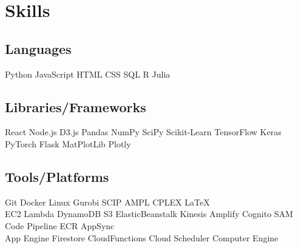 \documentclass[]{plushcv}
\begin{document}
\begin{minipage}[t]{0.25\textwidth} 


\section{Skills}
\subsection{Languages}
\sectionsep
Python \textbullet{} JavaScript \textbullet{} HTML \textbullet{} CSS \textbullet{} SQL \textbullet{} R \textbullet{} Julia

\sectionsep
\sectionsep
\subsection{Libraries/Frameworks}
\sectionsep
React \textbullet{} Node.js \textbullet{} D3.js \textbullet{} Pandas 
    \textbullet{} NumPy \textbullet{} SciPy \textbullet{} Scikit-Learn 
    \textbullet{} TensorFlow \textbullet{} Keras \textbullet{} PyTorch 
    \textbullet{} Flask \textbullet{} MatPlotLib \textbullet{} Plotly\\

\sectionsep
\sectionsep
\subsection{Tools/Platforms}
\sectionsep
Git  \textbullet{} Docker \textbullet{} Linux \textbullet{} Gurobi \textbullet{} SCIP \textbullet{} AMPL \textbullet{} CPLEX \textbullet{} \LaTeX \\
\sectionsep
{}
EC2 \textbullet{} Lambda \textbullet{} DynamoDB \textbullet{} S3 \textbullet{} ElasticBeanstalk
\textbullet{} Kinesis \textbullet{} Amplify \textbullet{} Cognito \textbullet{} SAM 
\textbullet{} Code Pipeline \textbullet{} ECR \textbullet{} AppSync\\
\sectionsep
{}
App Engine \textbullet{} Firestore \textbullet{} CloudFunctions \textbullet{} Cloud Scheduler \textbullet{} Computer Engine


\end{minipage}
\end{document}

